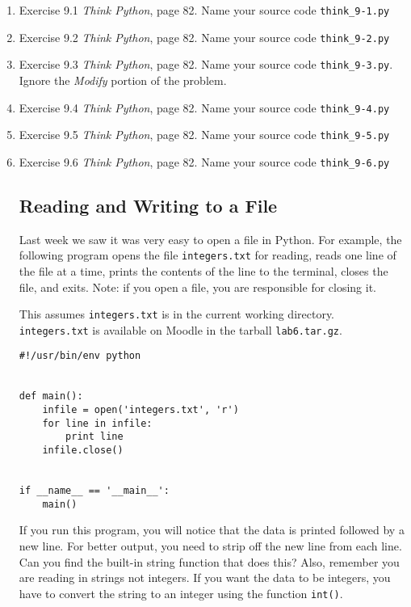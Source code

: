 \documentclass[12pt]{article}
\begin{document}
\begin{enumerate}
  \item Exercise 9.1 \emph{Think Python}, page 82. Name your source code \texttt{think\_9-1.py}


\item Exercise 9.2 \emph{Think Python}, page 82. Name your source code \texttt{think\_9-2.py}

\item Exercise 9.3 \emph{Think Python}, page 82. Name your source code \texttt{think\_9-3.py}. Ignore the \emph{Modify} portion of the problem.

\item Exercise 9.4 \emph{Think Python}, page 82. Name your source code \texttt{think\_9-4.py}

\item Exercise 9.5 \emph{Think Python}, page 82. Name your source code \texttt{think\_9-5.py}

\item Exercise 9.6 \emph{Think Python}, page 82. Name your source code \texttt{think\_9-6.py}


\subsection*{Reading and Writing to a File}
Last week we saw it was very easy to open a file in Python. For example, the following program opens the file \texttt{integers.txt} for reading, reads one line of the file at a time, prints the contents of the line to the terminal, closes the file, and exits. Note: if you open a file, you are responsible for closing it.

This assumes \texttt{integers.txt} is in the current working directory. \texttt{integers.txt} is available on Moodle in the tarball \texttt{lab6.tar.gz}.

\begin{verbatim}
#!/usr/bin/env python


def main():
    infile = open('integers.txt', 'r')
    for line in infile:
        print line
    infile.close()


if __name__ == '__main__':
    main()
\end{verbatim}

If you run this program, you will notice that the data is printed followed by a new line. For better output, you need to strip off the new line from each line. Can you find the built-in string function that does this? Also, remember you are reading in strings not integers. If you want the data to be integers, you have to convert the string to an integer using the function \texttt{int()}.


\end{enumerate}
\end{document}
